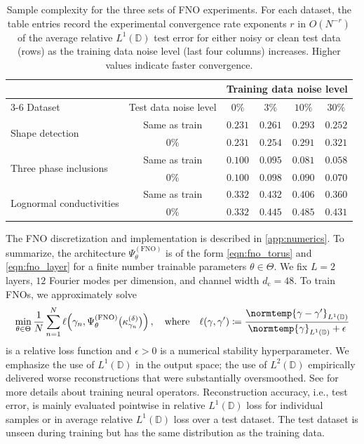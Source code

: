 \documentclass[pdflatex,sn-mathphys-num]{sn-jnl-preprint}
\newcommand{\D}{\mathbb{D}}
\newcommand{\norm}{\normtemp}
\newcommand{\defeq}{\coloneqq} %
\def\qw{\quad\text{where}\quad}
\theoremstyle{thmstyleone}%
\theoremstyle{thmstyletwo}%
\theoremstyle{thmstylethree}%
\numberwithin{equation}{section}
\numberwithin{theorem}{section}
\begin{document}
\begin{table}[tb]%
    \captionsetup{width=\textwidth,skip=10pt}
    \caption{Sample complexity for the three sets of FNO experiments. For each dataset, the table entries record the experimental convergence rate exponents $r$ in 
    $O(N^{-r})$ of the average relative $L^1(\D)$ test error 
    for either noisy or clean test data (rows) as the training data noise level (last four columns) increases. Higher values indicate faster convergence.}
    \label{tab:rates_all}
    \centering
    \renewcommand{\arraystretch}{1.2}
    \begin{tabular}{lccccc}
        \toprule
        & & \multicolumn{4}{c}{Training data noise level} \\
        \cmidrule(l){3-6}
        Dataset & Test data noise level & $0\%$ & $3\%$ & $10\%$ & $30\%$ \\
        \midrule
        \multirow{2}{*}{Shape detection} 
            & Same as train &  $0.231$ & $0.261$ & $0.293$ & $0.252$\\
            & $0\%$ &  $0.231$ & $0.254$ & $0.291$ & $0.321$\\
        \midrule
        \multirow{2}{*}{Three phase inclusions} 
            & Same as train &  $0.100$   & $0.095$ & $0.081$ & $0.058$ \\
            & $0\%$ & $0.100$  & $0.098$& $0.090$ & $0.070$ \\
        \midrule
        \multirow{2}{*}{Lognormal conductivities} 
            & Same as train &  $0.332$ & $0.432$ & $0.406$ & $0.360$\\
            & $0\%$ & $0.332$ & $0.445$ & $0.485$ & $0.431$ \\
        \bottomrule
    \end{tabular}
\end{table}

The FNO discretization and implementation is described in \cref{app:numerics}. To summarize, the architecture $\Psi_\theta^{(\mathrm{FNO})}$ is of the form \eqref{eqn:fno_torus} and \eqref{eqn:fno_layer} for a finite number trainable parameters $\theta\in\Theta$. We fix $L=2$ layers, $12$ Fourier modes per dimension, and channel width $d_\mathrm{c}=48$. To train FNOs, we approximately solve
\begin{align}\label{eqn:erm}
	\min_{\theta\in\Theta}\frac{1}{N}\sum_{n=1}^N\ell\Bigl(\gamma_n , \Psi_\theta^{(\mathrm{FNO})}\bigl(\kappa_{\gamma_n}^{(\delta)}\bigr)\Bigr)\,,\qw 	\ell(\gamma, \gamma')\defeq \frac{\norm{\gamma-\gamma'}_{L^1(\D)}}{\norm{\gamma}_{L^1(\D)}+\epsilon}
\end{align}
is a relative loss function and $\epsilon>0$ is a numerical stability hyperparameter. We emphasize the use of $L^1(\D)$ in the output space; the use of $L^2(\D)$ empirically delivered worse reconstructions that were substantially oversmoothed.
See \cite[Secs.~3.1 and 4.1.1]{nelsen2025operator} for more details about training neural operators. Reconstruction accuracy, i.e., test error, is mainly evaluated pointwise in relative $L^1(\D)$ loss for individual samples or in average relative $L^1(\D)$ loss over a test dataset. The test dataset is unseen during training but has the same distribution as the training data.
\end{document}

